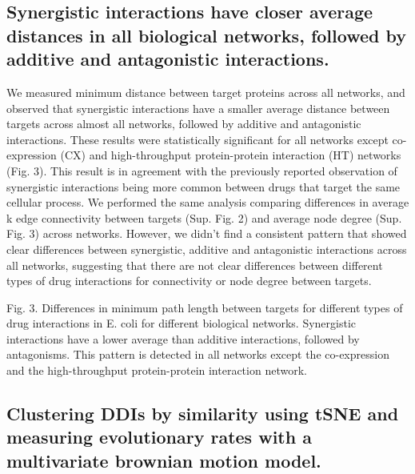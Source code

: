 \documentclass[]{elsarticle} %
\begin{document}
\hypertarget{synergistic-interactions-have-closer-average-distances-in-all-biological-networks-followed-by-additive-and-antagonistic-interactions.}{%
\subsection{Synergistic interactions have closer average distances in all biological networks, followed by additive and antagonistic interactions.}\label{synergistic-interactions-have-closer-average-distances-in-all-biological-networks-followed-by-additive-and-antagonistic-interactions.}}

We measured minimum distance between target proteins across all networks, and observed that synergistic interactions have a smaller average distance between targets across almost all networks, followed by additive and antagonistic interactions. These results were statistically significant for all networks except co-expression (CX) and high-throughput protein-protein interaction (HT) networks (Fig. 3). This result is in agreement with the previously reported observation of synergistic interactions being more common between drugs that target the same cellular process. We performed the same analysis comparing differences in average k edge connectivity between targets (Sup. Fig. 2) and average node degree (Sup. Fig. 3) across networks. However, we didn't find a consistent pattern that showed clear differences between synergistic, additive and antagonistic interactions across all networks, suggesting that there are not clear differences between different types of drug interactions for connectivity or node degree between targets.

Fig. 3. Differences in minimum path length between targets for different types of drug interactions in E. coli for different biological networks. Synergistic interactions have a lower average than additive interactions, followed by antagonisms. This pattern is detected in all networks except the co-expression and the high-throughput protein-protein interaction network.

\hypertarget{clustering-ddis-by-similarity-using-tsne-and-measuring-evolutionary-rates-with-a-multivariate-brownian-motion-model.}{%
\subsection{Clustering DDIs by similarity using tSNE and measuring evolutionary rates with a multivariate brownian motion model.}\label{clustering-ddis-by-similarity-using-tsne-and-measuring-evolutionary-rates-with-a-multivariate-brownian-motion-model.}}
\end{document}

